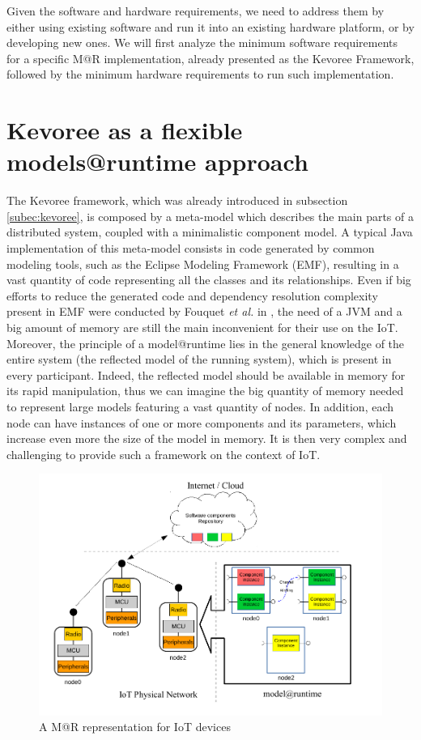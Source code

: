 Given the software and hardware requirements, we need to address them by either using existing software and run it into an existing hardware platform, or by developing new ones.
We will first analyze the minimum software requirements for a specific M@R implementation, already presented as the Kevoree Framework, followed by the minimum hardware requirements to run such implementation.

\section{Kevoree as a flexible models@runtime approach}
\label{sec:MAR_overview}
The Kevoree framework, which was already introduced in subsection \ref{subec:kevoree}, is composed by a meta-model which describes the main parts of a distributed system, coupled with a minimalistic component model.
A typical Java implementation of this meta-model consists in code generated by common modeling tools, such as the Eclipse Modeling Framework (EMF)\cite{steinberg2008emf}, resulting in a vast quantity of code representing all the classes and its relationships.
Even if big efforts to reduce the generated code and dependency resolution complexity present in EMF were conducted by Fouquet \textit{et al.} in \cite{fouquet2012eclipse}, the need of a JVM and a big amount of memory are still the main inconvenient for their use on the IoT.
Moreover, the principle of a model@runtime lies in the general knowledge of the entire system (the reflected model of the running system), which is present in every participant.
Indeed, the reflected model should be available in memory for its rapid manipulation, thus we can imagine the big quantity of memory needed to represent large models featuring a vast quantity of nodes.
In addition, each node can have instances of one or more components and its parameters, which increase even more the size of the model in memory.
It is then very complex and challenging to provide such a framework on the context of IoT.

\begin{figure}[]
	\centering
	\includegraphics[width=1\columnwidth]{chapters/modelsAtRuntimeContiki.images/MAR_IOT.pdf}
	\caption{A M@R representation for IoT devices}
	\label{fig:MAR_IOT}
\end{figure}

